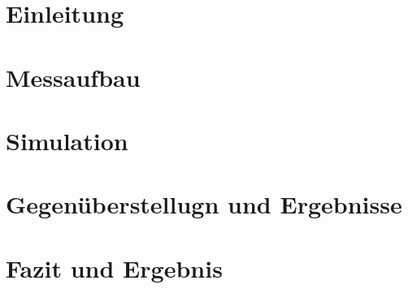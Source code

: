 \documentclass[parskip, twoside, accentcolor=tud9b, colorback, breaklinks, noresetcounter, noheadingspace, pdfencoding=unicode, 11pt, bigchapter, numbersubsubsec, numbers=noenddot, linedtoc, longdoc]{tudreport}
\begin{document}
\frontmatter
\hypersetup{pageanchor=false}
\maketitle
\hypersetup{pageanchor=true}
\cleardoublepage

%

\cleardoublepage
\pagestyle{plain}
\tableofcontents
\cleardoublepage


\pagestyle{headings}

\chapter{Einleitung}\label{chap:einleitung}
	
	 
	
\chapter{Messaufbau}\label{chap:messaufbau}
	
	
\chapter{Simulation}\label{chap:simulation}
	\label{ch:sim}
	
	
	
\chapter{Gegen\"uberstellugn und Ergebnisse}\label{chap:ergebnis}
	
	
	
\chapter{Fazit und Ergebnis}\label{chap:fazit}
	
\end{document}
